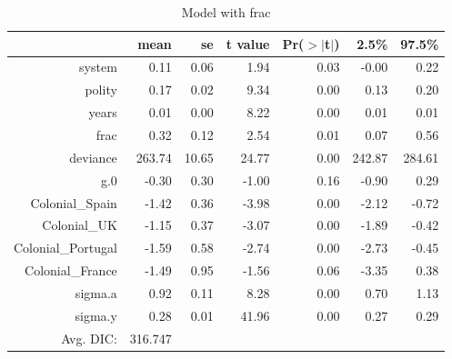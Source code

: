 \documentclass[12pt]{article}
\begin{document}
\begin{table}[ht]
\centering
\begin{tabular}{rrrrrrr}
  \hline
 & mean & se & t value & Pr($>$$|$t$|$) & 2.5\% & 97.5\% \\ 
  \hline
system & 0.11 & 0.06 & 1.94 & 0.03 & -0.00 & 0.22 \\ 
  polity & 0.17 & 0.02 & 9.34 & 0.00 & 0.13 & 0.20 \\ 
  years & 0.01 & 0.00 & 8.22 & 0.00 & 0.01 & 0.01 \\ 
  frac & 0.32 & 0.12 & 2.54 & 0.01 & 0.07 & 0.56 \\ 
  deviance & 263.74 & 10.65 & 24.77 & 0.00 & 242.87 & 284.61 \\ 
  g.0 & -0.30 & 0.30 & -1.00 & 0.16 & -0.90 & 0.29 \\ 
  Colonial\_Spain & -1.42 & 0.36 & -3.98 & 0.00 & -2.12 & -0.72 \\ 
  Colonial\_UK & -1.15 & 0.37 & -3.07 & 0.00 & -1.89 & -0.42 \\ 
  Colonial\_Portugal & -1.59 & 0.58 & -2.74 & 0.00 & -2.73 & -0.45 \\ 
  Colonial\_France & -1.49 & 0.95 & -1.56 & 0.06 & -3.35 & 0.38 \\ 
  sigma.a & 0.92 & 0.11 & 8.28 & 0.00 & 0.70 & 1.13 \\ 
  sigma.y & 0.28 & 0.01 & 41.96 & 0.00 & 0.27 & 0.29 \\ 
   \hline
Avg. DIC:&316.747\\
\hline
\end{tabular}
\caption{Model with frac} 
\end{table}
\end{document}

